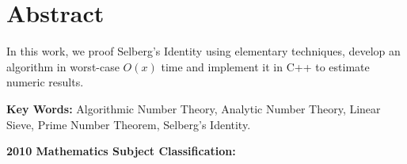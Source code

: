 \chapter*{Abstract}

In this work, we proof Selberg's Identity using elementary techniques,
develop an algorithm in worst-case \(O(x)\) time and
implement it in C++ to estimate numeric results.

\bigskip
\textbf{Key Words:}
Algorithmic Number Theory,
Analytic Number Theory,
Linear Sieve,
Prime Number Theorem,
Selberg's Identity.

\bigskip
\textbf{2010 Mathematics Subject Classification:}

\setcounter{page}{4}
